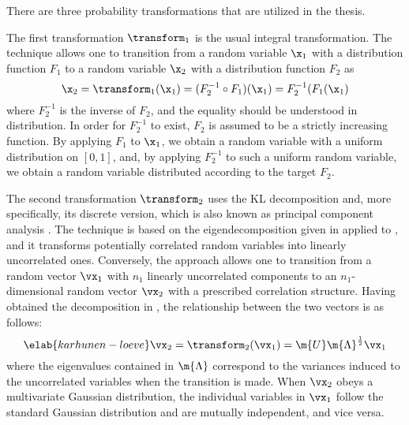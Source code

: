 There are three probability transformations that are utilized in the thesis.

The first transformation $\transform_1$ is the usual integral transformation.
The technique allows one to transition from a random variable $\x_1$ with a
distribution function $F_1$ to a random variable $\x_2$ with a distribution
function $F_2$ as
\[
  \x_2 = \transform_1(\x_1) = (F_2^{-1} \circ F_1)(\x_1) = F_2^{-1}(F_1(\x_1)
\]
where $F_2^{-1}$ is the inverse of $F_2$, and the equality should be understood
in distribution. In order for $F_2^{-1}$ to exist, $F_2$ is assumed to be a
strictly increasing function. By applying $F_1$ to $\x_1$, we obtain a random
variable with a uniform distribution on $[0, 1]$, and, by applying $F_2^{-1}$ to
such a uniform random variable, we obtain a random variable distributed
according to the target $F_2$.

The second transformation $\transform_2$ uses the \ac{KL} decomposition
\cite{ghanem1991, xiu2010} and, more specifically, its discrete version, which
is also known as principal component analysis \cite{hastie2013}. The technique
is based on the eigendecomposition given in  applied to
, and it transforms potentially correlated random
variables into linearly uncorrelated ones. Conversely, the approach allows one
to transition from a random vector $\vx_1$ with $n_1$ linearly uncorrelated
components to an $n_1$-dimensional random vector $\vx_2$ with a prescribed
correlation structure. Having obtained the decomposition in
, the relationship between the two vectors is as
follows:
\begin{equation} \elab{karhunen-loeve}
  \vx_2 = \transform_2(\vx_1) = \m{U} \m{\Lambda}^\frac{1}{2} \vx_1
\end{equation}
where the eigenvalues contained in $\m{\Lambda}$ correspond to the variances
induced to the uncorrelated variables when the transition is made. When $\vx_2$
obeys a multivariate Gaussian distribution, the individual variables in $\vx_1$
follow the standard Gaussian distribution and are mutually independent, and vice
versa.


